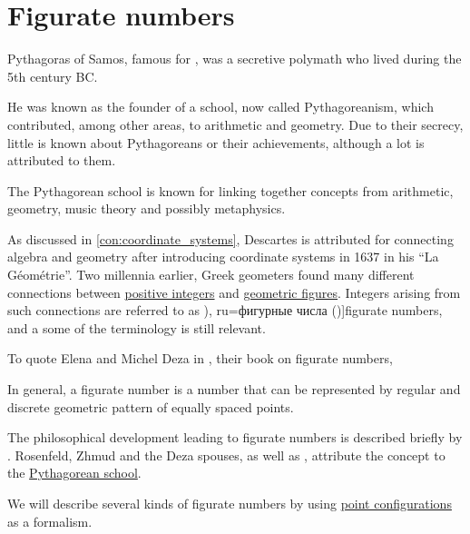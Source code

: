 \section{Figurate numbers}\label{sec:figurate_numbers}

\begin{remark}\label{rem:pythagoreanism}
  Pythagoras of Samos, famous for , was a secretive polymath who lived during the 5th century BC.

  He was known as the founder of a school, now called Pythagoreanism, which contributed, among other areas, to arithmetic and geometry. Due to their secrecy, little is known about Pythagoreans or their achievements, although a lot is attributed to them.

  The Pythagorean school is known for linking together concepts from arithmetic, geometry, music theory and possibly metaphysics.
\end{remark}

\begin{concept}\label{con:figurate_number}
  As discussed in \cref{con:coordinate_systems}, Descartes is attributed for connecting algebra and geometry after introducing coordinate systems in 1637 in his \enquote{La Géométrie}. Two millennia earlier, Greek geometers found many different connections between \hyperref[def:integers]{positive integers} and \hyperref[con:geometric_shape]{geometric figures}. Integers arising from such connections are referred to as \term[en=figurate number (\cite[xv]{Deza2012FigurateNumbers}), ru=фигурные числа (\cite[14]{Розенфельд1963ОсновныеПонятиеГеометрии})]{figurate numbers}, and a some of the terminology is still relevant.

  To quote Elena and Michel Deza in \cite[xv]{Deza2012FigurateNumbers}, their book on figurate numbers,
  \begin{displayquote}
    In general, a figurate number is a number that can be represented by regular and discrete geometric pattern of equally spaced points.
  \end{displayquote}

  The philosophical development leading to figurate numbers is described briefly by . Rosenfeld, Zhmud and the Deza spouses, as well as , attribute the concept to the \hyperref[rem:pythagoreanism]{Pythagorean school}.

  We will describe several kinds of figurate numbers by using \hyperref[def:point_configuration]{point configurations} as a formalism.
\end{concept}

